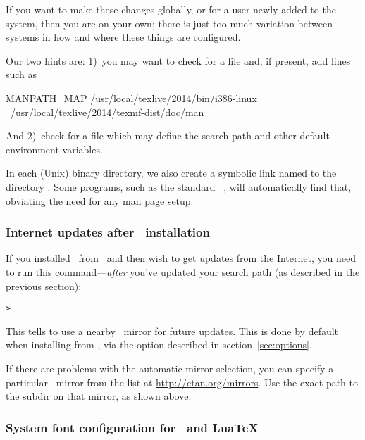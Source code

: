 \documentclass{article}
\begin{document}
If you want to make these changes globally, or for a user newly added to
the system, then you are on your own; there is just too much variation
between systems in how and where these things are configured.

Our two hints are: 1)~you may want to check for a file
 and, if present, add lines such as

\begin{sverbatim}
MANPATH_MAP /usr/local/texlive/2014/bin/i386-linux \
            /usr/local/texlive/2014/texmf-dist/doc/man
\end{sverbatim}

And 2)~check for a file  which may define the
search path and other default environment variables.

In each (Unix) binary directory, we also create a symbolic link named
 to the directory \dirname{texmf-dist/doc/man}.  Some 
programs, such as the standard \MacOSX\ \code{man}, will automatically
find that, obviating the need for any man page setup.


\subsubsection{Internet updates after \DVD\ installation}
\label{sec:dvd-install-net-updates}

If you installed \TL\ from \DVD\ and then wish to get updates from the
Internet, you need to run this command---\emph{after} you've updated
your search path (as described in the previous section):

\begin{alltt}
> 
\end{alltt}

This tells  to use a nearby \CTAN\ mirror for future updates.
This is done by default when installing from \DVD, via the option
described in section~\ref{sec:options}.

If there are problems with the automatic mirror selection, you can
specify a particular \CTAN\ mirror from the list at
\url{http://ctan.org/mirrors}.  Use the exact path to the
 subdir on that mirror, as shown above.


\subsubsection{System font configuration for \XeTeX\ and Lua\TeX}
\label{sec:font-conf-sys}
\end{document}
